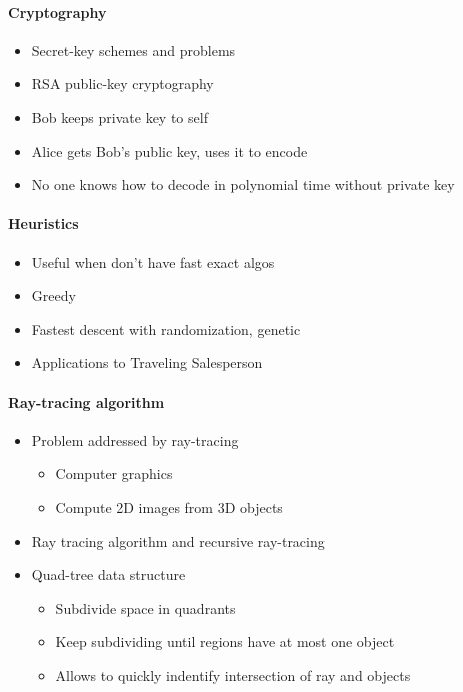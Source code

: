 \documentclass[12 pt]{article}
\theoremstyle{definition}
\begin{document}
          \paragraph{Cryptography}
          \begin{itemize}
          \item Secret-key schemes and problems
          \item RSA public-key cryptography
          \item Bob keeps private key to self
          \item Alice gets Bob's public key, uses it to encode
            \item No one knows how to decode in polynomial time without private key
            \end{itemize}
            \paragraph{Heuristics}
            \begin{itemize}
            \item Useful when don't have fast exact algos
            \item Greedy
            \item Fastest descent with randomization, genetic
            \item Applications to Traveling Salesperson
            \end{itemize}
            \paragraph{Ray-tracing algorithm}
            \begin{itemize}
            \item Problem addressed by ray-tracing
              \begin{itemize}
              \item Computer graphics
              \item Compute 2D images from 3D objects
              \end{itemize}
              \item Ray tracing algorithm and recursive ray-tracing
              \item Quad-tree data structure
                \begin{itemize}
                \item Subdivide space in quadrants
                \item Keep subdividing until regions have at most one object
                  \item Allows to quickly indentify intersection of ray and objects
                \end{itemize}
            \end{itemize}
      
\end{document}
